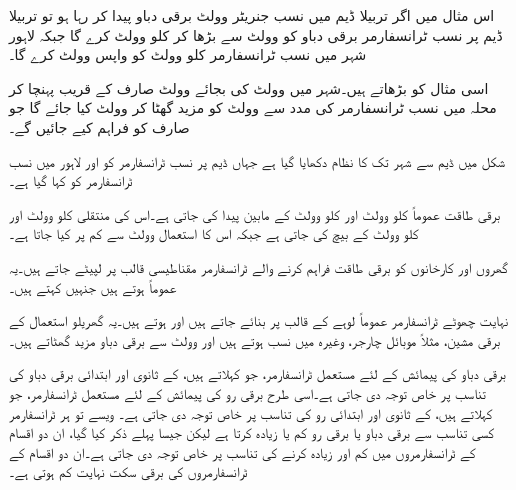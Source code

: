 اس مثال میں اگر تربیلا ڈیم میں نسب جنریٹر  وولٹ برقی دباو پیدا کر رہا ہو تو تربیلا ڈیم  پر نسب  ٹرانسفارمر برقی دباو کو  وولٹ سے بڑھا کر  کلو وولٹ کرے گا جبکہ لاہور شہر میں نسب  ٹرانسفارمر   کلو وولٹ کو واپس  وولٹ کرے گا۔

اسی مثال کو بڑھاتے ہیں۔شہر میں  وولٹ کی بجائے  وولٹ صارف کے قریب  پہنچا کر محلہ میں نسب ٹرانسفارمر  کی مدد سے   وولٹ کو مزید گھٹا کر   وولٹ کیا جائے گا جو صارف کو فراہم کیے جائیں گے۔  

شکل  میں ڈیم سے شہر تک کا نظام دکھایا گیا ہے جہاں ڈیم پر نسب ٹرانسفارمر کو   اور لاہور میں نسب ٹرانسفارمر کو   کہا گیا ہے۔

برقی طاقت عموماً  کلو وولٹ اور   کلو وولٹ کے مابین پیدا کی جاتی ہے۔اس کی منتقلی   کلو وولٹ اور   کلو وولٹ کے بیچ کی جاتی ہے جبکہ اس کا استعمال   وولٹ سے کم پر کیا جاتا ہے۔

گھروں اور کارخانوں کو برقی طاقت فراہم کرنے والے ٹرانسفارمر مقناطیسی قالب پر لپیٹے جاتے ہیں۔یہ عموماً   ہوتے ہیں جنہیں   کہتے ہیں۔

نہایت چھوٹے ٹرانسفارمر عموماً لوہے کے قالب  پر بنائے جاتے ہیں اور  ہوتے ہیں۔یہ گھریلو استعمال کے برقی مشین، مثلاً موبائل چارجر، وغیرہ میں نسب ہوتے ہیں اور  وولٹ سے برقی دباو مزید گھٹاتے ہیں۔

برقی دباو کی پیمائش کے لئے مستعمل ٹرانسفارمر، جو   کہلاتے ہیں،   کے  ثانوی  اور ابتدائی  برقی دباو کی تناسب  پر خاص توجہ دی جاتی ہے۔اسی طرح برقی رو کی  پیمائش کے لئے مستعمل ٹرانسفارمر، جو   کہلاتے ہیں،  کے ثانوی اور  ابتدائی  رو کی تناسب پر خاص توجہ دی جاتی ہے۔ ویسے تو ہر ٹرانسفارمر کسی تناسب سے  برقی دباو یا برقی رو کم یا زیادہ کرتا ہے لیکن جیسا پہلے ذکر کیا گیا، ان دو اقسام کے ٹرانسفارمروں میں کم اور زیادہ کرنے کی تناسب پر خاص توجہ دی جاتی ہے۔ان دو اقسام کے ٹرانسفارمروں کی برقی سکت نہایت کم ہوتی ہے۔

